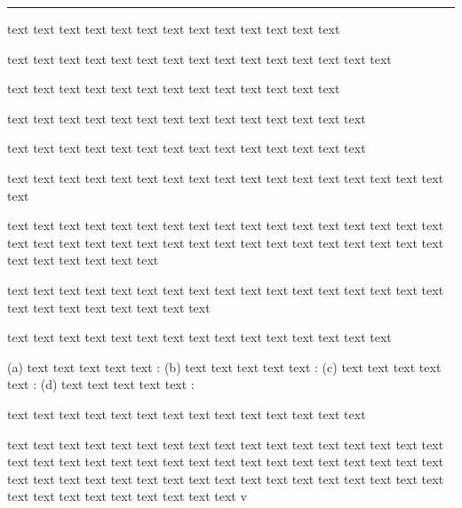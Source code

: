 \documentclass[12pt]{exam}
\begin{document}
\noindent
\rule[1ex]{\textwidth}{1pt}
\begin{questions}



\question[1] text text text text text text text text text text text text text \citep{ENEM(1998)}

\begin{choices}

\choice text text text text text text text text text text text text text text text 

\choice text text text text text text text text text text text text text 

\choice text text text text text text text text text text text text text text 

\choice text text text text text text text text text text text text text text 

\choice text text text text text text text text text text text text text text text text text text 

\end{choices}


\question[2] text text text text text text text text text text text text text text text text text text text text text text text text text text text text text text text text text text text text text text text text 

\fillwithlines{1.8 in}


\question[1] text text text text text text text text text text text text text text text text text text text text text text text text text 


\fillwithlines{1 in}


\question[2] text text text text text text text text text text text text text text text 

(a) text text text text text : \fillwithlines{0.9 in}
(b) text text text text text : \fillwithlines{0.9 in}
(c) text text text text text : \fillwithlines{0.9 in}
(d) text text text text text : \fillwithlines{0.9 in}


\question[1] text text text text text text text text text text text text text text 

\begin{choices}

\choice text text text text text text text text text text text text text text 
\choice text text text text text text text text text text text 
\choice text text text text text text text text text text text text 
\choice text text text text text text text text text text text 
\choice text text text text text text text text text text text text v



\end{choices}
\end{questions}
\end{document}
